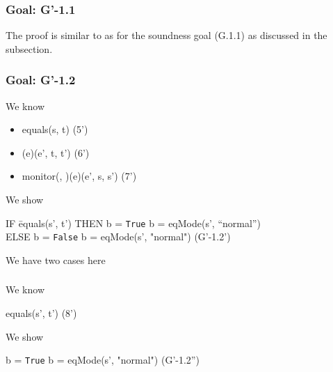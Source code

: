 \documentclass[conference]{IEEEtran}
\begin{document}
\subsubsection*{Goal: G'-1.1}

The proof is similar to as for the soundness goal (G.1.1) as discussed in the subsection. 

\subsubsection*{Goal: G'-1.2}

\noindent We know

\begin{itemize}
\item equals(s, t)   \hspace*{3.5cm} (5')
\item \textlbrackdbl \textrbrackdbl(e)(e', t, t')  \hspace*{2.7cm} (6')
\item monitor(, )(e)(e', s, s')  \hspace*{1.4cm} (7')
\end{itemize}

\noindent We show
\begin{center}
\begin{tabbing}
IF \=equals(s', t')  THEN b = \texttt{True}  b = eqMode(s', ``normal'')
\\ELSE b = \texttt{False}  b = eqMode(s', "normal")
  \hspace*{1cm} (G'-1.2')
 \end{tabbing}
\end{center}

\noindent We have two cases here

\subsubsection*{}

\noindent We know

\begin{center}
equals(s', t')  \hspace*{1.5cm} (8')
\end{center}

\noindent We show
\begin{center}
 b = \texttt{True}  b = eqMode(s', "normal")  \hspace*{1cm} (G'-1.2'')
\end{center}
\end{document}
